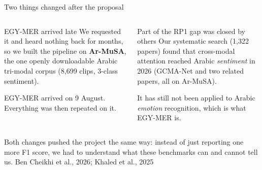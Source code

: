 \documentclass[aspectratio=169,10pt]{beamer}
\newcommand{\source}[1]{\vfill\hfill{\scriptsize\textcolor{MutedGray}{#1}}}
\begin{document}
\begin{frame}[t]{Two things changed after the proposal}
\begin{columns}[T,onlytextwidth]
\begin{block}{EGY-MER arrived late}
We requested it and heard nothing back for months, so we built the pipeline on
\textbf{Ar-MuSA}, the one openly downloadable Arabic tri-modal corpus
(8,699 clips, 3-class sentiment).

\vspace{0.2cm}
EGY-MER arrived on 9 August. Everything was then repeated on it.
\end{block}
\begin{block}{Part of the RP1 gap was closed by others}
Our systematic search (1,322 papers) found that cross-modal attention reached
Arabic \emph{sentiment} in 2026 (GCMA-Net and two related papers, all on Ar-MuSA).

\vspace{0.2cm}
It has still not been applied to Arabic \emph{emotion} recognition, which is
what EGY-MER is.
\end{block}
\end{columns}
\vspace{0.3cm}
\small Both changes pushed the project the same way: instead of just reporting
one more F1 score, we had to understand what these benchmarks can and cannot tell us.
\source{Ben Cheikhi et al., 2026; Khaled et al., 2025}
\end{frame}
\end{document}
